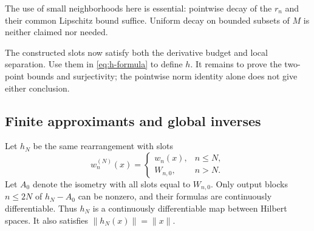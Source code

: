 The use of small neighborhoods here is essential: pointwise decay of
the $r_n$ and their common Lipschitz bound suffice. Uniform decay on
bounded subsets of $M$ is neither claimed nor needed.

The constructed slots now satisfy both the derivative budget and
local separation. Use them in \eqref{eq:h-formula} to define $h$.
It remains to prove the two-point bounds and surjectivity; the
pointwise norm identity alone does not give either conclusion.

\subsection{Finite approximants and global inverses}

Let $h_N$ be the same rearrangement with slots
\[
 w_n^{(N)}(x)=
 \begin{cases}w_n(x),&n\le N,\\W_{n,0},&n>N.\end{cases}
\]
Let $A_0$ denote the isometry with all slots equal to $W_{n,0}$.
Only output blocks $n\le2N$ of $h_N-A_0$ can be nonzero, and their
formulas are continuously differentiable. Thus $h_N$ is a
continuously differentiable map between Hilbert spaces. It also
satisfies $\|h_N(x)\|=\|x\|$.


